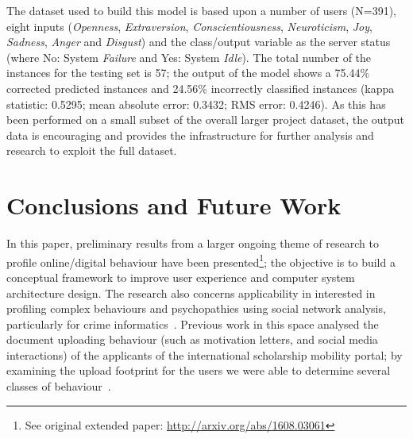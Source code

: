 \documentclass[graybox]{svmult}
\begin{document}
{{{The dataset used to build this model is based upon a number of users
(N=391), eight inputs ({\emph{Openness}}, {\emph{Extraversion}},
{\emph{Conscientiousness}}, {\emph{Neuroticism}}, {\emph{Joy}},
{\emph{Sadness}}, {\emph{Anger}} and {\emph{Disgust}}) and the
class/output variable as the server status (where No: System
{\emph{Failure}} and Yes: System {\emph{Idle}}). The total number of
the instances for the testing set is 57; the output of the model shows
a 75.44\% corrected predicted instances and 24.56\% incorrectly
classified instances (kappa statistic: 0.5295; mean absolute error:
0.3432; RMS error: 0.4246). As this has been performed
on a small subset of the overall larger project dataset, the output
data is encouraging and provides the infrastructure for further
analysis and research to exploit the full dataset.

\section{Conclusions and Future Work}\label{conclusions}



In this paper, preliminary results from a larger ongoing theme of
research to profile online/digital behaviour have been
presented\footnote{See original extended paper:
\url{http://arxiv.org/abs/1608.03061}}; the objective is to build a
conceptual framework to improve user experience and computer system
architecture design. The research also concerns applicability in
interested in profiling complex behaviours and psychopathies using
social network analysis, particularly for crime
informatics~\cite{oatley+crick:2015}. Previous work in this space
analysed the document uploading behaviour (such as motivation letters,
and social media interactions) of the applicants of the international
scholarship mobility portal; by examining the upload footprint for the
users we were able to determine several classes of
behaviour~\cite{oatley-et-al-soccogcomp2015}.

}}}
\end{document}

